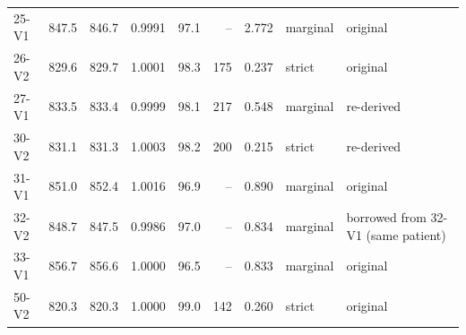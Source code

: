 \begin{tabular}{lrrrrrrll}
25-V1 & 847.5 & 846.7 & 0.9991 & 97.1 & -- & 2.772 & marginal & original \\
26-V2 & 829.6 & 829.7 & 1.0001 & 98.3 & 175 & 0.237 & strict & original \\
27-V1 & 833.5 & 833.4 & 0.9999 & 98.1 & 217 & 0.548 & marginal & re-derived \\
30-V2 & 831.1 & 831.3 & 1.0003 & 98.2 & 200 & 0.215 & strict & re-derived \\
31-V1 & 851.0 & 852.4 & 1.0016 & 96.9 & -- & 0.890 & marginal & original \\
32-V2 & 848.7 & 847.5 & 0.9986 & 97.0 & -- & 0.834 & marginal & borrowed from 32-V1 (same patient) \\
33-V1 & 856.7 & 856.6 & 1.0000 & 96.5 & -- & 0.833 & marginal & original \\
50-V2 & 820.3 & 820.3 & 1.0000 & 99.0 & 142 & 0.260 & strict & original \\
\bottomrule
\end{tabular}
